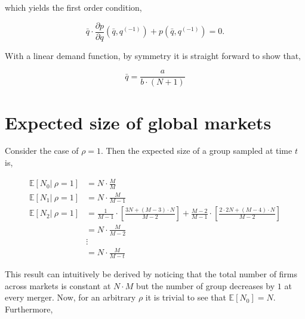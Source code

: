 \documentclass[american]{scrartcl}
\newcommand{\E}{\mathbb{E}}
\begin{document}
which yields the first order condition,

\begin{equation*}
    \bar{q} \cdot \frac{ \partial p}{\partial q}\left(\bar{q}, q^{(-1)}\right) + p\left(\bar{q}, q^{(-1)}\right) = 0.
\end{equation*}

With a linear demand function, by symmetry it is straight forward to show that,

\begin{equation*}
    \bar{q} = \frac{a}{b \cdot (N+1)}
\end{equation*}

\section{Expected size of global markets} \label{A:exp_size}

Consider the case of $\rho = 1$. Then the expected size of a group sampled at time $t$ is,

\begin{equation*}
    \begin{split}
        \E[N_0 \vert \ \rho = 1] &= N \cdot \frac{M}{M} \\
        \E[N_1 \vert \ \rho = 1] &=  N \cdot \frac{M}{M-1}  \\
        \E[N_2 \vert \ \rho = 1] &=  \frac{1}{M-1} \cdot \left[ \frac{3N + (M-3) \cdot N}{M-2} \right] + \frac{M-2}{M-1} \cdot \left[ \frac{2 \cdot 2N + (M-4) \cdot N}{M-2} \right] \\ &= N \cdot \frac{M}{M-2} \\
        &\vdots \\
        &= N \cdot \frac{M}{M-t}
    \end{split}
\end{equation*}

This result can intuitively be derived by noticing that the total number of firms across markets is constant at $N \cdot M$ but the number of group decreases by $1$ at every merger. Now, for an arbitrary $\rho$ it is trivial to see that $\E[N_0] = N$. Furthermore,
\end{document}
